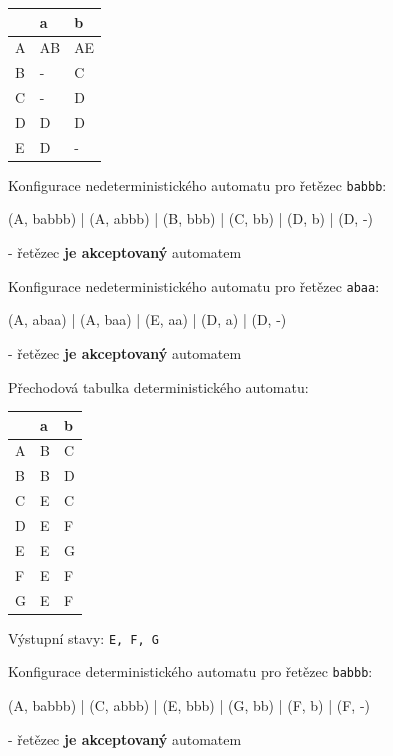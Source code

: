 \documentclass[11pt]{article}
\begin{document}
\bigskip

\begin{tabular}{| l | l | l |}
\hline
  & a & b \\ \hline
A & AB & AE \\ \hline
B & - & C \\ \hline
C & - & D \\ \hline
D & D & D \\ \hline
E & D & - \\
\hline
\end{tabular}

\bigskip

Konfigurace nedeterministického automatu pro řetězec \texttt{babbb}:

(A, babbb) | (A, abbb) | (B, bbb) | (C, bb) | (D, b) | (D, -)

- řetězec \textbf{je akceptovaný} automatem

\bigskip

Konfigurace nedeterministického automatu pro řetězec \texttt{abaa}:

(A, abaa) | (A, baa) | (E, aa) | (D, a) | (D, -)

- řetězec \textbf{je akceptovaný} automatem

\bigskip

Přechodová tabulka deterministického automatu:

\bigskip

\begin{tabular}{| l | l | l |}
\hline
  & a & b \\ \hline
A & B & C \\ \hline
B & B & D \\ \hline
C & E & C \\ \hline
D & E & F \\ \hline
E & E & G \\ \hline
F & E & F \\ \hline
G & E & F \\
\hline
\end{tabular}

\bigskip

Výstupní stavy: \texttt{E, F, G}

\bigskip

Konfigurace deterministického automatu pro řetězec \texttt{babbb}:

(A, babbb) | (C, abbb) | (E, bbb) | (G, bb) | (F, b) | (F, -)

- řetězec \textbf{je akceptovaný} automatem

\bigskip
\end{document}

